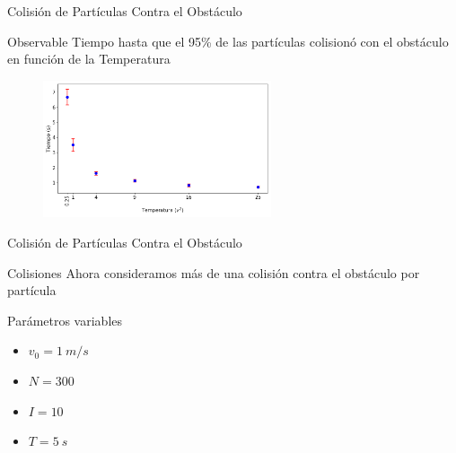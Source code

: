 \begin{frame}{Colisión de Partículas Contra el Obstáculo}
    \begin{block}{Observable}
        Tiempo hasta que el 95\% de las partículas colisionó con el obstáculo en función de la Temperatura
    \end{block}

    \begin{figure}[H]
        \centering
        \includegraphics[width=0.6\textwidth]{pic/ejer3/aObs}
        \label{fig:ejer3:aobservable}
    \end{figure}

\end{frame}


\begin{frame}{Colisión de Partículas Contra el Obstáculo}

    \begin{block}{Colisiones}
        Ahora consideramos más de una colisión contra el obstáculo por partícula
    \end{block}

    \begin{minipage}{0.8\textwidth}
        \begin{block}{Parámetros variables}
            \begin{itemize}
                \item $v_0 = 1\ m/s$
                \item $N = 300$
                \item $I = 10$
                \item $T = 5\ s$
            \end{itemize}
        \end{block}
    \end{minipage}

\end{frame}



